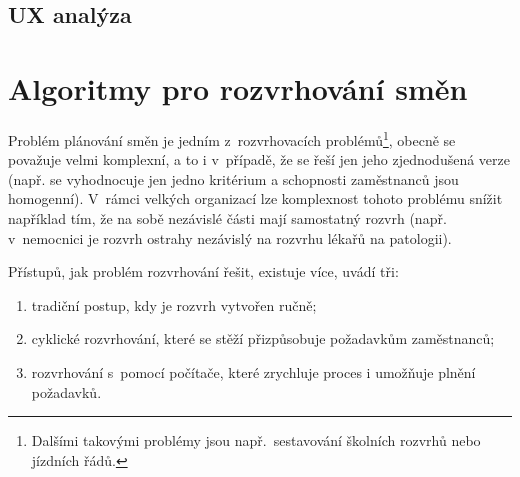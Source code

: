 \documentclass[twoside]{ctuthesis}
\begin{document}
%
%



\section{UX analýza}



\chapter{Algoritmy pro rozvrhování směn}
Problém plánování směn je jedním z~rozvrhovacích problémů\footnote{Dalšími takovými problémy jsou např.~sestavování školních rozvrhů nebo jízdních řádů.}, obecně se považuje velmi komplexní, a to i v~případě, že se řeší jen jeho zjednodušená verze (např. se vyhodnocuje jen jedno kritérium a schopnosti zaměstnanců jsou homogenní). V~rámci velkých organizací lze komplexnost tohoto problému snížit například tím, že na sobě nezávislé části mají samostatný rozvrh (např. v~nemocnici je rozvrh ostrahy nezávislý na rozvrhu lékařů na patologii).

Přístupů, jak problém rozvrhování řešit, existuje více, \cite{burke2004state} uvádí tři:
\begin{enumerate}
	\item tradiční postup, kdy je rozvrh vytvořen ručně;
	\item cyklické rozvrhování, které se stěží přizpůsobuje požadavkům zaměstnanců;
	\item rozvrhování s~pomocí počítače, které zrychluje proces i umožňuje plnění požadavků.
\end{enumerate}
\end{document}
